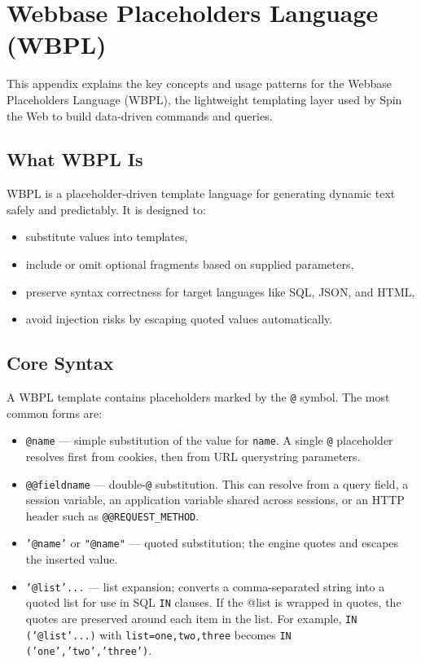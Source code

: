 
\chapter{Webbase Placeholders Language (WBPL)}
\label{app:wbpl}

This appendix explains the key concepts and usage patterns for the Webbase Placeholders Language (WBPL), the lightweight templating layer used by Spin the Web to build data-driven commands and queries.

\section{What WBPL Is}
WBPL is a placeholder-driven template language for generating dynamic text safely and predictably. It is designed to:
\begin{itemize}
  \item substitute values into templates,
  \item include or omit optional fragments based on supplied parameters,
  \item preserve syntax correctness for target languages like SQL, JSON, and HTML,
  \item avoid injection risks by escaping quoted values automatically.
\end{itemize}

\section{Core Syntax}
\label{sec:app-wbpl-syntax}

A WBPL template contains placeholders marked by the \texttt{@} symbol. The most common forms are:
\begin{itemize}
  \item \texttt{@name} — simple substitution of the value for \texttt{name}. A single \texttt{@} placeholder resolves first from cookies, then from URL querystring parameters.
  \item \texttt{@@fieldname} — double-\texttt{@} substitution. This can resolve from a query field, a session variable, an application variable shared across sessions, or an HTTP header such as \texttt{@@REQUEST\_METHOD}.
  \item \texttt{'@name'} or \texttt{"@name"} — quoted substitution; the engine quotes and escapes the inserted value.
  \item \texttt{'@list'...} — list expansion; converts a comma-separated string into a quoted list for use in SQL \texttt{IN} clauses. If the @list is wrapped in quotes, the quotes are preserved around each item in the list. For example, \texttt{IN ('@list'...)} with \texttt{list=one,two,three} becomes \texttt{IN ('one','two','three')}.
\end{itemize}

